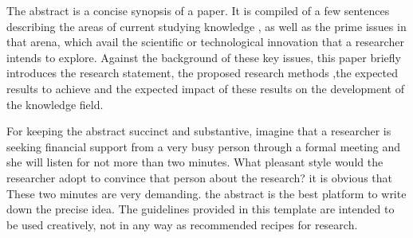 The abstract is a concise  synopsis of a paper. It is compiled of a few sentences describing the areas of current studying knowledge , as well as the prime issues in that arena, which avail the scientific or technological innovation that a researcher intends to explore. Against the background of these key issues, this paper briefly introduces the research statement, the proposed research methods ,the expected results to achieve and the expected impact of these results on the development of the knowledge field.

For keeping the abstract succinct and substantive, imagine that a researcher is  seeking financial support from a very busy person through  a formal meeting and she will listen  for not more than two minutes. What pleasant style  would the researcher adopt to convince that person about the research? it is obvious that These two minutes are very demanding. the abstract is the best platform to write down the precise idea. The guidelines provided in this template are intended to be used creatively, not in any way as recommended recipes for research.